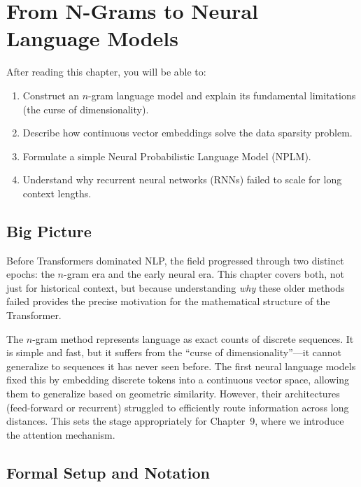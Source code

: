 \chapter{From N-Grams to Neural Language Models}
\label{ch:08}

\begin{keyinsight}
After reading this chapter, you will be able to:
\begin{enumerate}
  \item Construct an $n$-gram language model and explain its fundamental limitations (the curse of dimensionality).
  \item Describe how continuous vector embeddings solve the data sparsity problem.
  \item Formulate a simple Neural Probabilistic Language Model (NPLM).
  \item Understand why recurrent neural networks (RNNs) failed to scale for long context lengths.
\end{enumerate}
\end{keyinsight}

\section{Big Picture}
\label{ch:08:sec:big_picture}

Before Transformers dominated NLP, the field progressed through two distinct epochs: the $n$-gram era and the early neural era. This chapter covers both, not just for historical context, but because understanding \emph{why} these older methods failed provides the precise motivation for the mathematical structure of the Transformer.

The $n$-gram method represents language as exact counts of discrete sequences. It is simple and fast, but it suffers from the ``curse of dimensionality''---it cannot generalize to sequences it has never seen before. The first neural language models fixed this by embedding discrete tokens into a continuous vector space, allowing them to generalize based on geometric similarity. However, their architectures (feed-forward or recurrent) struggled to efficiently route information across long distances. This sets the stage appropriately for Chapter~9, where we introduce the attention mechanism.

\section{Formal Setup and Notation}
\label{ch:08:sec:setup}

